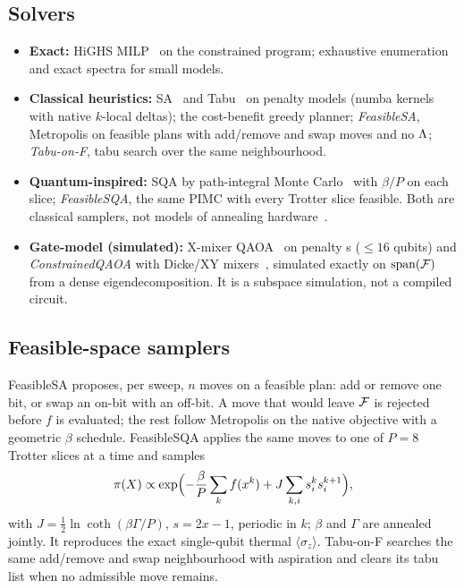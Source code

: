 \documentclass[conference]{IEEEtran}
\begin{document}
\subsection{Solvers}
\begin{itemize}
\item \textbf{Exact:} HiGHS MILP~\cite{huangfu2018} on the constrained program; exhaustive
enumeration and exact spectra for small models.
\item \textbf{Classical heuristics:} SA~\cite{kirkpatrick1983} and Tabu~\cite{glover1989} on penalty
models (numba kernels with native $k$-local deltas); the cost-benefit greedy planner;
\emph{FeasibleSA}, Metropolis on feasible plans with add/remove and swap moves and no $\Lambda$;
\emph{Tabu-on-F}, tabu search over the same neighbourhood.
\item \textbf{Quantum-inspired:} SQA by path-integral Monte Carlo~\cite{martonak2002} with $\beta/P$
on each slice; \emph{FeasibleSQA}, the same PIMC with every Trotter slice feasible. Both are
classical samplers, not models of annealing hardware~\cite{heim2015}.
\item \textbf{Gate-model (simulated):} X-mixer QAOA~\cite{farhi2014} on penalty \QUBO{}s ($\le16$
qubits) and \emph{ConstrainedQAOA} with Dicke/XY mixers~\cite{hadfield2019}, simulated exactly on
$\mathrm{span}(\mathcal{F})$ from a dense eigendecomposition. It is a subspace simulation, not a compiled
circuit.
\end{itemize}
\subsection{Feasible-space samplers}
FeasibleSA proposes, per sweep, $n$ moves on a feasible plan: add or remove one bit, or swap an
on-bit with an off-bit. A move that would leave $\mathcal{F}$ is rejected before $f$ is
evaluated; the rest follow Metropolis on the native objective with a geometric $\beta$ schedule.
FeasibleSQA applies the same moves to one of $P=8$ Trotter slices at a time and samples
\begin{equation}
\pi(X)\propto\exp\Bigl(-\frac{\beta}{P}\sum_{k}f(x^k)+J\sum_{k,i}s^k_is^{k+1}_i\Bigr),
\end{equation}
with $J=\tfrac12\ln\coth(\beta\Gamma/P)$, $s=2x-1$, periodic in $k$; $\beta$ and $\Gamma$ are annealed jointly. It reproduces the exact single-qubit thermal $\langle\sigma_z\rangle$.
Tabu-on-F searches the same add/remove and swap neighbourhood with aspiration and clears its
tabu list when no admissible move remains.
\end{document}
